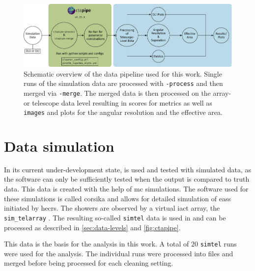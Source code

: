 \begin{figure}
    \centering
    \includegraphics[width=\textwidth]{graphics/data_pipeline.pdf}
    \caption{Schematic overview of the data pipeline used for this work. Single runs of the simulation
    data are processed with \ctapipe\texttt{-process} and then merged via \ctapipe\texttt{-merge}.
    The merged data is then processed on the array- or telescope data level resulting in scores for metrics
    as well as \dlo{} \texttt{images} and plots for the angular resolution and the effective area.}
    \label{fig:data-processing}
\end{figure}


\section{Data simulation}
\label{sec:data-simulation}

In its current under-development state, \ctapipe{} is used and tested with simulated data, as the software
can only be sufficiently tested when the output is compared to truth data. This data is created with the help of
\gls{mc} simulations. The software used for these simulations is called \gls{corsika} \cite{corsika} and
allows for detailed simulation of \glspl{eas} initiated by \glspl{hecr}. The showers are observed by
a virtual \gls{iact} array, the \texttt{sim\_telarray} \cite{bernlohr2008}. The resulting so-called
\texttt{simtel} data is used in \ctapipe{} and can be processed as described in \autoref{sec:data-levels}
and \autoref{fig:ctapipe}.

This data is the basis for the analysis in this work. A total of 
\(\num{20}\) \texttt{simtel} runs were used for the analysis. The individual runs were processed into \dlo{} files
and merged before being processed for each cleaning setting.

